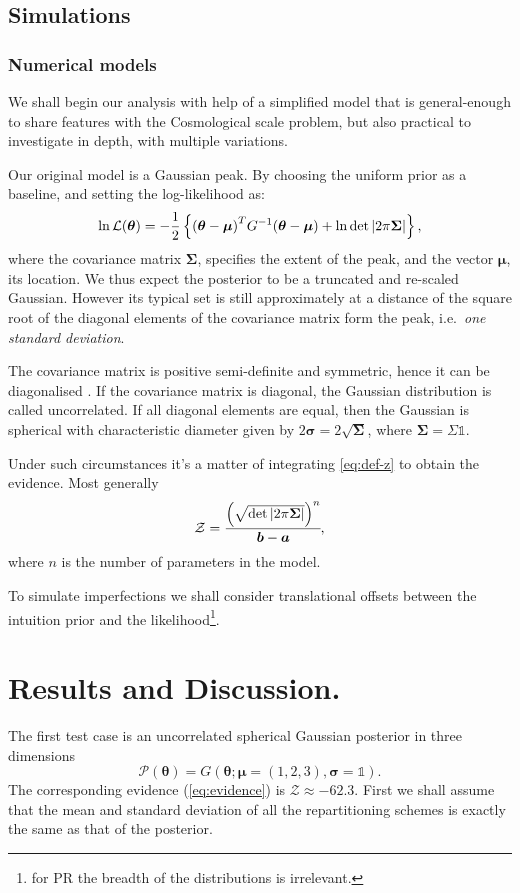 \documentclass[usenatbib]{mnras}
\begin{document}
\subsection{Simulations}
\subsubsection{Numerical models}

We shall begin our analysis with help of a simplified model that is
general-enough to share features with the Cosmological scale problem,
but also practical to investigate in depth, with multiple variations.

Our original model is a Gaussian peak. By choosing the uniform prior
as a baseline, and setting the log-likelihood as:
\begin{equation*}
  \ln {\cal L}(\bm{\theta}) = - \dfrac{1}{2} \left\{{(\bm{\theta} - \bm{\mu})}^{T}G^{-1}(\bm{\theta}-\bm{\mu})  + \ln \det \left| 2\mathrm{\pi} \bm{\Sigma}\right| \right\},
\end{equation*}
where the covariance matrix \(\bm{\Sigma}\), specifies the extent of
the peak, and the vector \(\bm{\mu}\), its location. We thus expect
the posterior to be a truncated and re-scaled Gaussian. However its
typical set is still approximately at a distance of the square root of
the diagonal elements of the covariance matrix form the peak,
i.e.~\emph{one standard deviation}.

The covariance matrix is positive semi-definite and symmetric, hence
it can be diagonalised \citep{taboga2017lectures}. If the covariance
matrix is diagonal, the Gaussian distribution is called
uncorrelated. If all diagonal elements are equal, then the Gaussian is
spherical with characteristic diameter given by
\(2\bm{\sigma} = 2\sqrt{\bm{\Sigma}}\), where \(\bm{\Sigma} = \Sigma \mathds{1}\).


Under such circumstances it's a matter of integrating \cref{eq:def-z}
to obtain the evidence. Most generally
\begin{equation}\label{eq:evidence}
   {\cal Z} = \cfrac{{\left( \sqrt{ \det \left| 2\mathrm{\pi} \bm{\Sigma} \right|} \right)}^{n}}{\bm{b}-\bm{a}}, 
\end{equation}
where \(n\) is the number of parameters in the model.

To simulate imperfections we shall consider translational offsets
between the intuition prior and the likelihood\footnote{for PR the
  breadth of the distributions is irrelevant.}.


\section{Results and Discussion.}\label{sec:org50493c6}
The first test case is an uncorrelated spherical Gaussian posterior
in three dimensions \[\mathcal{P}(\bm{\theta}) = G(\bm{\theta}; \bm{\mu} =
  (1,2,3),\bm{\sigma} = \mathds{1}).\] The corresponding evidence
(\cref{eq:evidence}) is \(\mathcal{Z}\approx-62.3\). First we shall
assume that the mean and standard deviation of all the
repartitioning schemes is exactly the same as that of the
posterior.
\end{document}

